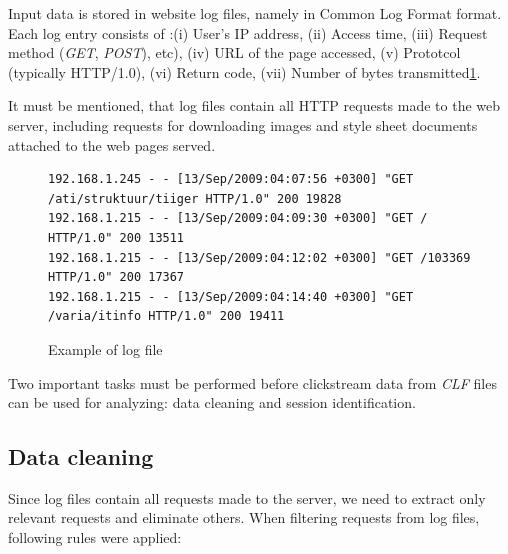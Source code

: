 \documentclass[english,a4paper]{article}
\begin{document}
Input data is stored in website log files, namely in Common Log Format\cite{ref_clf} format. Each log entry consists of :(i) User's IP address, (ii) Access time, (iii) Request method (\emph{GET}, \emph{POST}), etc), (iv) URL of the page accessed, (v) Prototcol (typically HTTP/1.0), (vi) Return code, (vii) Number of bytes transmitted\ref{log_sample}.

It must be mentioned, that log files contain all HTTP requests made to the web server, including requests for downloading images and style sheet documents attached to the web pages served.

\begin{figure}[h]
{\tiny
\begin{verbatim}
192.168.1.245 - - [13/Sep/2009:04:07:56 +0300] "GET /ati/struktuur/tiiger HTTP/1.0" 200 19828
192.168.1.215 - - [13/Sep/2009:04:09:30 +0300] "GET / HTTP/1.0" 200 13511
192.168.1.215 - - [13/Sep/2009:04:12:02 +0300] "GET /103369 HTTP/1.0" 200 17367
192.168.1.215 - - [13/Sep/2009:04:14:40 +0300] "GET /varia/itinfo HTTP/1.0" 200 19411
\end{verbatim}
}
\label{log_sample}
\caption{Example of log file}
\end{figure}

Two important tasks must be performed before clickstream data from \emph{CLF} files can be used for analyzing: data cleaning and session identification.







\subsection{Data cleaning}
Since log files contain all requests made to the server, we need to extract only relevant requests and eliminate others. When filtering requests from log files, following rules were applied:
\end{document}
